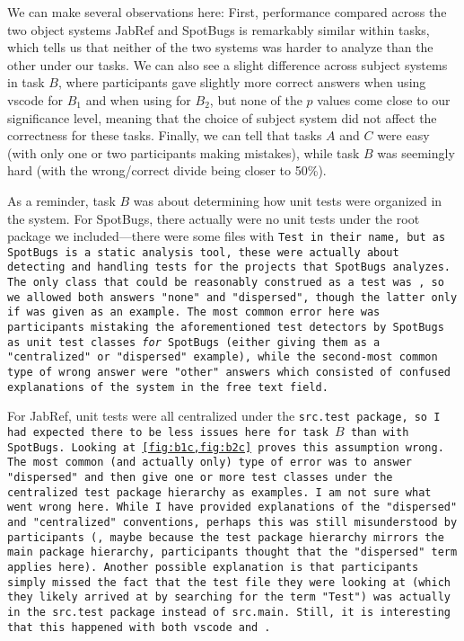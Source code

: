 \documentclass[../thesis]{subfiles}
\begin{document}
We can make several observations here:
First, performance compared across the two object systems JabRef and SpotBugs is remarkably similar within tasks, which tells us that neither of the two systems was harder to analyze than the other under our tasks.
We can also see a slight difference across subject systems in task $B$, where participants gave slightly more correct answers when using \gls{vscode} for $B_1$ and when using \SEE{} for $B_2$, but none of the $p$ values come close to our significance level, meaning that the choice of subject system did not affect the correctness for these tasks.
Finally, we can tell that tasks $A$ and $C$ were easy (with only one or two participants making mistakes), while task $B$ was seemingly hard (with the wrong/correct divide being closer to 50\%).

As a reminder, task $B$ was about determining how unit tests were organized in the system.
For SpotBugs, there actually were no unit tests under the root package we included---there were some files with \tt{Test} in their name, but as SpotBugs is a static analysis tool, these were actually about detecting and handling tests for the projects that SpotBugs analyzes.
The only class that could be reasonably construed as a test was , so we allowed both answers "none" and "dispersed", though the latter only if  was given as an example.
The most common error here was participants mistaking the aforementioned test detectors by SpotBugs as unit test classes \emph{for} SpotBugs (either giving them as a "centralized" or "dispersed" example), while the second-most common type of wrong answer were "other" answers which consisted of confused explanations of the system in the free text field.

For JabRef, unit tests were all centralized under the \tt{src.test} package, so I had expected there to be less issues here for task $B$ than with SpotBugs.
Looking at \cref{fig:b1c,fig:b2c} proves this assumption wrong.
The most common (and actually only) type of error was to answer "dispersed" and then give one or more test classes under the centralized test package hierarchy as examples.
I am not sure what went wrong here.
While I have provided explanations of the "dispersed" and "centralized" conventions, perhaps this was still misunderstood by participants (\eg, maybe because the test package hierarchy mirrors the main package hierarchy, participants thought that the "dispersed" term applies here).
Another possible explanation is that participants simply missed the fact that the test file they were looking at (which they likely arrived at by searching for the term "Test") was actually in the \tt{src.test} package instead of \tt{src.main}.
Still, it is interesting that this happened with both \gls{vscode} and \SEE{}.
\end{document}
